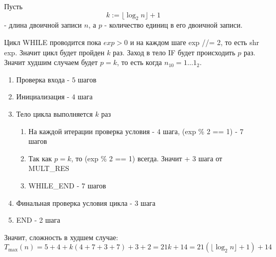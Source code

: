 \documentclass[12pt]{article}
\begin{document}
Пусть
\[
 k:=\lfloor\log_2 n\rfloor+1
\]
- длина двоичной записи $n$, а $p$ - количество единиц в его двоичной записи.

Цикл WHILE проводится пока $exp>0$ и на каждом шаге exp //= 2, то есть shr exp. Значит цикл будет пройден $k$ раз. Заход в тело IF будет происходить $p$ раз. Значит худшим случаем будет $p=k$, то есть когда $n_{10}=1\dots1_2$.

\begin{enumerate}
    \item Проверка входа - $5$ шагов
    \item Инициализация - $4$ шага
    \item Тело цикла выполняется $k$ раз
    \begin{enumerate}
        \item На каждой итерации проверка условия - $4$ шага, (exp \% 2 == 1) - $7$ шагов
        \item Так как $p=k$, то (exp \% 2 == 1) всегда. Значит + 3 шага от MULT\_RES
        \item WHILE\_END - $7$ шагов
    \end{enumerate}
    \item Финальная проверка условия цикла - 3 шага
    \item END - 2 шага
\end{enumerate}

Значит, сложность в худшем случае:
\[
    T_{\max}(n) = 5+4+k(4 + 7 + 3 + 7) + 3 + 2 = 21k + 14 = 21(\lfloor\log_2 n\rfloor+1) + 14
\]
\end{document}
